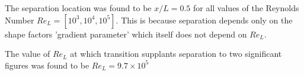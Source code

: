 

The separation location was found to be $x/L = 0.5$ for all values of the Reynolds Number $Re_L = [10^3, 10^4, 10^5]$. This is because separation depends only on the shape factors 'gradient parameter' which itself does not depend on $Re_L$.

The value of $Re_L$ at which transition supplants separation to two significant figures was found to be $Re_L = 9.7\times10^5$

